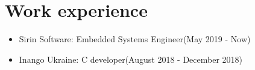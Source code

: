 \section{Work experience}

\begin{itemize}
    \item Sirin Software: Embedded Systems Engineer\hspace*{\fill}(May 2019 - Now)
    \item Inango Ukraine: C developer\hspace*{\fill}(August 2018 - December 2018)
\end{itemize}
